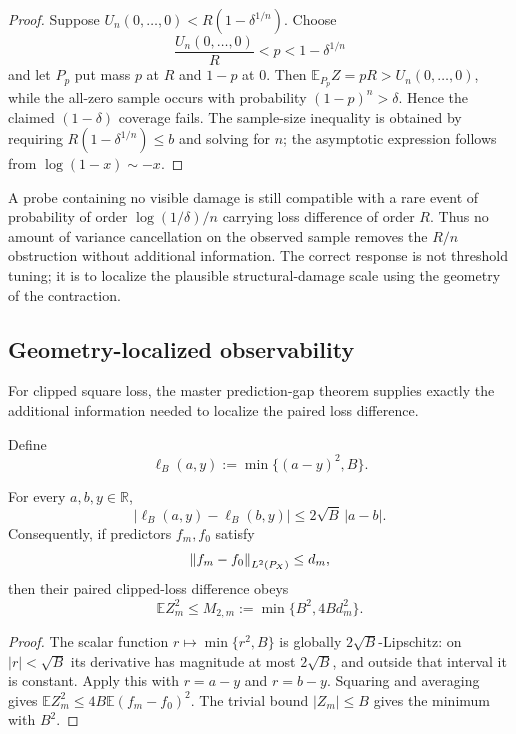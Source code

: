 \begin{proof}
Suppose $U_n(0,\ldots,0)<R(1-\delta^{1/n})$. Choose
\[
\frac{U_n(0,\ldots,0)}R<p<1-\delta^{1/n}
\]
and let $P_p$ put mass $p$ at $R$ and $1-p$ at $0$. Then $\mathbb E_{P_p}Z=pR>U_n(0,\ldots,0)$, while the all-zero sample occurs with probability $(1-p)^n>\delta$. Hence the claimed $(1-\delta)$ coverage fails. The sample-size inequality is obtained by requiring $R(1-\delta^{1/n})\le b$ and solving for $n$; the asymptotic expression follows from $\log(1-x)\sim-x$.
\end{proof}

\begin{remark}[Interpretation]
A probe containing no visible damage is still compatible with a rare event of probability of order $\log(1/\delta)/n$ carrying loss difference of order $R$. Thus no amount of variance cancellation on the observed sample removes the $R/n$ obstruction without additional information. The correct response is not threshold tuning; it is to localize the plausible structural-damage scale using the geometry of the contraction.
\end{remark}

\subsection{Geometry-localized observability}
For clipped square loss, the master prediction-gap theorem supplies exactly the additional information needed to localize the paired loss difference.

Define
\[
\ell_B(a,y):=\min\{(a-y)^2,B\}.
\]

\begin{lemma}\label{lem:loss-gap-moment}
For every $a,b,y\in\mathbb R$,
\[
|\ell_B(a,y)-\ell_B(b,y)|
\le
2\sqrt B\,|a-b|.
\]
Consequently, if predictors $f_m,f_0$ satisfy
\[
\left\lVert f_m-f_0\right\rVert_{L^2(P_X)}\le d_m,
\]
then their paired clipped-loss difference obeys
\[
\boxed{
\mathbb E Z_m^2
\le
M_{2,m}:=\min\{B^2,4Bd_m^2\}.
}
\]
\end{lemma}

\begin{proof}
The scalar function $r\mapsto\min\{r^2,B\}$ is globally $2\sqrt B$-Lipschitz: on $|r|<\sqrt B$ its derivative has magnitude at most $2\sqrt B$, and outside that interval it is constant. Apply this with $r=a-y$ and $r=b-y$. Squaring and averaging gives $\mathbb E Z_m^2\le4B\mathbb E(f_m-f_0)^2$. The trivial bound $|Z_m|\le B$ gives the minimum with $B^2$.
\end{proof}

